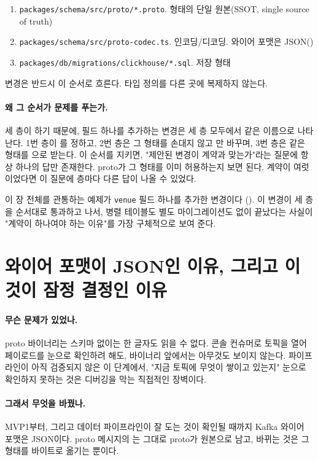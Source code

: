 \begin{enumerate}
  \item \texttt{packages/schema/src/proto/*.proto}. 형태의 단일 원본(SSOT, single
    source of truth)
  \item \texttt{packages/schema/src/proto-codec.ts}. 인코딩/디코딩. 와이어 포맷은
    JSON()
  \item \texttt{packages/db/migrations/clickhouse/*.sql}. 저장 형태
\end{enumerate}

변경은 반드시 이 순서로 흐른다. 타입 정의를 다른 곳에 복제하지 않는다.

\paragraph{왜 그 순서가 문제를 푸는가.} 세 층이 하기 때문에, 필드 하나를 추가하는 변경은 세 층 모두에서 같은 이름으로 나타난다.
1번 층이 를 정하고, 2번 층은 그 형태를 손대지 않고 만 바꾸며, 3번 층은 같은 형태를 으로 받는다. 이 순서를
지키면, "제안된 변경이 계약과 맞는가"라는 질문에 항상 하나의 답만 존재한다. proto가
그 형태를 이미 허용하는지 보면 된다. 계약이 여럿이었다면 이 질문에 층마다 다른
답이 나올 수 있었다.

이 장 전체를 관통하는 예제가 \texttt{venue} 필드 하나를 추가한 변경이다
(). 이 변경이 세 층을 순서대로 통과하고 나서, 병렬 테이블도
별도 마이그레이션도 없이 끝났다는 사실이 "계약이 하나여야 하는 이유"를 가장 구체적으로
보여 준다.

\section{와이어 포맷이 JSON인 이유, 그리고 이것이 잠정 결정인 이유}
\label{sec:contract-wire}

\paragraph{무슨 문제가 있었나.} proto 바이너리는 스키마 없이는 한 글자도 읽을 수
없다. 콘솔 컨슈머로 토픽을 열어 페이로드를 눈으로 확인하려 해도, 바이너리 앞에서는
아무것도 보이지 않는다. 파이프라인이 아직 검증되지 않은 이 단계에서, "지금 토픽에
무엇이 쌓이고 있는지" 눈으로 확인하지 못하는 것은 디버깅을 막는 직접적인 장벽이다.

\paragraph{그래서 무엇을 바꿨나.} MVP1부터, 그리고 데이터 파이프라인이 잘 도는 것이
확인될 때까지 Kafka 와이어 포맷은 JSON이다. proto 메시지의 는 그대로
proto가 원본으로 남고, 바뀌는 것은 그 형태를 바이트로 옮기는 뿐이다.

